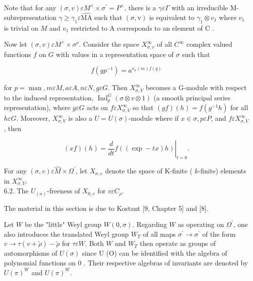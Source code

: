 \documentclass[10pt]{article}
\begin{document}
Note that for any $(\sigma, v) \varepsilon M^{\wedge} \times \sigma^{\prime}=P^{\wedge}$, there is a $\gamma \varepsilon \Gamma$ with an irreducible M-subrepresentation $\gamma \geqslant \gamma_{1} \varepsilon \hat{\mathrm{MA}}$ such that $(\sigma, \mathrm{v})$ is equivalent to $\gamma_{1} \otimes v_{1}$ where $v_{1}$ is trivial on $M$ and $v_{1}$ restricted to A corresponds to an element of C .

Now let $(\sigma, v) \varepsilon M^{\wedge} \times \sigma^{\nu}$. Consider the space $X_{\sigma, v}^{\infty}$ of all $C^{\infty}$ complex valued functions $f$ on $G$ with values in a representation space of $\sigma$ such that


\begin{equation*}
f\left(g p^{-1}\right)=a^{v_{\sigma}(m) f(q)} \tag{6.1.3}
\end{equation*}


for $p=\operatorname{man}, m \varepsilon M, a \varepsilon A, n \varepsilon N, g \varepsilon G$. Then $X_{\sigma, V}^{\infty}$ becomes a G-module with respect to the induced representation, $\operatorname{Ind}_{p}^{G}(\sigma \otimes v \otimes 1)$ (a smooth principal series\\
representation), where $g \varepsilon G$ acts on $f \varepsilon X_{\sigma, V}^{\infty}$ so that $(g f)(h)=f\left(g^{-1} h\right)$ for all $h \varepsilon G$. Moreover, $X_{\sigma, V}^{\infty}$ is also a $U=U(\sigma)$-module where if $x \in \sigma, p \varepsilon P$, and $f \varepsilon X_{\sigma, V}^{\infty}$, then


\begin{equation*}
(x f)(h)=\left.\frac{d}{d t} f((\exp -t x) h)\right|_{t=0} . \tag{6.1.4}
\end{equation*}


For any $(\sigma, v) \varepsilon \hat{M} \times \Omega^{\prime}$, let $X_{\sigma, v}$ denote the space of K-finite ( $k$-finite) elements in $X_{\sigma, V}^{\infty}$.\\
6.2. The $U_{(n)}$-freeness of $X_{0, v}$ for $v \varepsilon C_{\rho}$.

The material in this section is due to Kostant [9, Chapter 5] and [8].

Let $W$ be the "little" Weyl group $W(0, \sigma)$. Regarding $W$ as operating on $\Omega^{\prime}$, one also introduces the translated Weyl group $W_{T}$ of all maps $\sigma^{\prime} \rightarrow \sigma^{\prime}$ of the form $v \rightarrow \tau(v+\tilde{\rho})-\tilde{\rho}$ for $\tau \varepsilon W$. Both $W$ and $W_{T}$ then operate as groups of automorphisms of $U(\sigma)$ since U (O) can be identified with the algebra of polynomial functions on 0 . Their respective algebras of invariants are denoted by $U(\pi)^{W}$ and $U(\pi)^{W}$.
\end{document}
